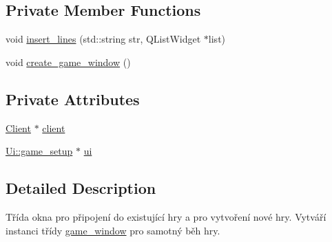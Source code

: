 \subsection*{Private Member Functions}
\begin{DoxyCompactItemize}
\item 
void \hyperlink{classgame__setup_ab8e203a71abb83f72a58c44507fbaa35}{insert\-\_\-lines} (std\-::string str, Q\-List\-Widget $\ast$list)
\item 
void \hyperlink{classgame__setup_a3c451d7c5327b93bccd5f7bbc5d27176}{create\-\_\-game\-\_\-window} ()
\end{DoxyCompactItemize}
\subsection*{Private Attributes}
\begin{DoxyCompactItemize}
\item 
\hyperlink{classClient}{Client} $\ast$ \hyperlink{classgame__setup_adbd0161cc227afe2a8a11c018ee5f139}{client}
\item 
\hyperlink{classUi_1_1game__setup}{Ui\-::game\-\_\-setup} $\ast$ \hyperlink{classgame__setup_a025d51998d4c93dd935319c017d6dd00}{ui}
\end{DoxyCompactItemize}


\subsection{Detailed Description}
Třída okna pro připojení do existující hry a pro vytvoření nové hry. Vytváří instanci třídy \hyperlink{classgame__window}{game\-\_\-window} pro samotný běh hry. 


